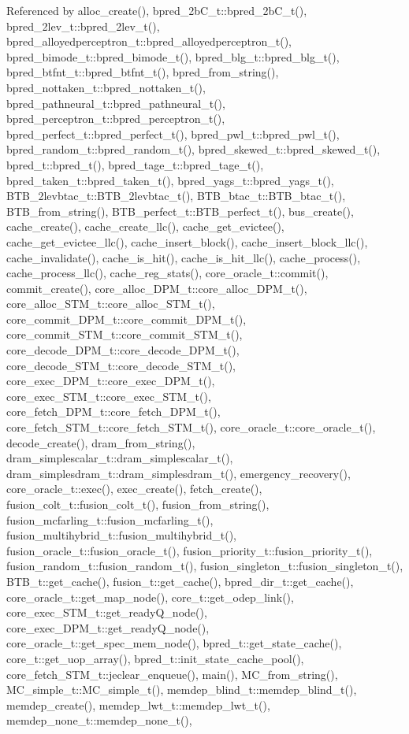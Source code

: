 Referenced by alloc\_\-create(), bpred\_\-2bC\_\-t::bpred\_\-2bC\_\-t(), bpred\_\-2lev\_\-t::bpred\_\-2lev\_\-t(), bpred\_\-alloyedperceptron\_\-t::bpred\_\-alloyedperceptron\_\-t(), bpred\_\-bimode\_\-t::bpred\_\-bimode\_\-t(), bpred\_\-blg\_\-t::bpred\_\-blg\_\-t(), bpred\_\-btfnt\_\-t::bpred\_\-btfnt\_\-t(), bpred\_\-from\_\-string(), bpred\_\-nottaken\_\-t::bpred\_\-nottaken\_\-t(), bpred\_\-pathneural\_\-t::bpred\_\-pathneural\_\-t(), bpred\_\-perceptron\_\-t::bpred\_\-perceptron\_\-t(), bpred\_\-perfect\_\-t::bpred\_\-perfect\_\-t(), bpred\_\-pwl\_\-t::bpred\_\-pwl\_\-t(), bpred\_\-random\_\-t::bpred\_\-random\_\-t(), bpred\_\-skewed\_\-t::bpred\_\-skewed\_\-t(), bpred\_\-t::bpred\_\-t(), bpred\_\-tage\_\-t::bpred\_\-tage\_\-t(), bpred\_\-taken\_\-t::bpred\_\-taken\_\-t(), bpred\_\-yags\_\-t::bpred\_\-yags\_\-t(), BTB\_\-2levbtac\_\-t::BTB\_\-2levbtac\_\-t(), BTB\_\-btac\_\-t::BTB\_\-btac\_\-t(), BTB\_\-from\_\-string(), BTB\_\-perfect\_\-t::BTB\_\-perfect\_\-t(), bus\_\-create(), cache\_\-create(), cache\_\-create\_\-llc(), cache\_\-get\_\-evictee(), cache\_\-get\_\-evictee\_\-llc(), cache\_\-insert\_\-block(), cache\_\-insert\_\-block\_\-llc(), cache\_\-invalidate(), cache\_\-is\_\-hit(), cache\_\-is\_\-hit\_\-llc(), cache\_\-process(), cache\_\-process\_\-llc(), cache\_\-reg\_\-stats(), core\_\-oracle\_\-t::commit(), commit\_\-create(), core\_\-alloc\_\-DPM\_\-t::core\_\-alloc\_\-DPM\_\-t(), core\_\-alloc\_\-STM\_\-t::core\_\-alloc\_\-STM\_\-t(), core\_\-commit\_\-DPM\_\-t::core\_\-commit\_\-DPM\_\-t(), core\_\-commit\_\-STM\_\-t::core\_\-commit\_\-STM\_\-t(), core\_\-decode\_\-DPM\_\-t::core\_\-decode\_\-DPM\_\-t(), core\_\-decode\_\-STM\_\-t::core\_\-decode\_\-STM\_\-t(), core\_\-exec\_\-DPM\_\-t::core\_\-exec\_\-DPM\_\-t(), core\_\-exec\_\-STM\_\-t::core\_\-exec\_\-STM\_\-t(), core\_\-fetch\_\-DPM\_\-t::core\_\-fetch\_\-DPM\_\-t(), core\_\-fetch\_\-STM\_\-t::core\_\-fetch\_\-STM\_\-t(), core\_\-oracle\_\-t::core\_\-oracle\_\-t(), decode\_\-create(), dram\_\-from\_\-string(), dram\_\-simplescalar\_\-t::dram\_\-simplescalar\_\-t(), dram\_\-simplesdram\_\-t::dram\_\-simplesdram\_\-t(), emergency\_\-recovery(), core\_\-oracle\_\-t::exec(), exec\_\-create(), fetch\_\-create(), fusion\_\-colt\_\-t::fusion\_\-colt\_\-t(), fusion\_\-from\_\-string(), fusion\_\-mcfarling\_\-t::fusion\_\-mcfarling\_\-t(), fusion\_\-multihybrid\_\-t::fusion\_\-multihybrid\_\-t(), fusion\_\-oracle\_\-t::fusion\_\-oracle\_\-t(), fusion\_\-priority\_\-t::fusion\_\-priority\_\-t(), fusion\_\-random\_\-t::fusion\_\-random\_\-t(), fusion\_\-singleton\_\-t::fusion\_\-singleton\_\-t(), BTB\_\-t::get\_\-cache(), fusion\_\-t::get\_\-cache(), bpred\_\-dir\_\-t::get\_\-cache(), core\_\-oracle\_\-t::get\_\-map\_\-node(), core\_\-t::get\_\-odep\_\-link(), core\_\-exec\_\-STM\_\-t::get\_\-readyQ\_\-node(), core\_\-exec\_\-DPM\_\-t::get\_\-readyQ\_\-node(), core\_\-oracle\_\-t::get\_\-spec\_\-mem\_\-node(), bpred\_\-t::get\_\-state\_\-cache(), core\_\-t::get\_\-uop\_\-array(), bpred\_\-t::init\_\-state\_\-cache\_\-pool(), core\_\-fetch\_\-STM\_\-t::jeclear\_\-enqueue(), main(), MC\_\-from\_\-string(), MC\_\-simple\_\-t::MC\_\-simple\_\-t(), memdep\_\-blind\_\-t::memdep\_\-blind\_\-t(), memdep\_\-create(), memdep\_\-lwt\_\-t::memdep\_\-lwt\_\-t(), memdep\_\-none\_\-t::memdep\_\-none\_\-t(), 